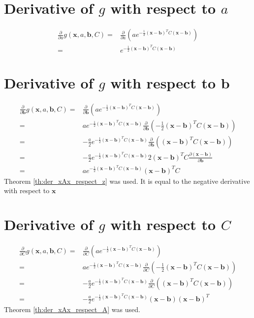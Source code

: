 \documentclass{paper}
\newcommand{\vr}[1]{\ensuremath{\boldsymbol{#1}}}
\newcommand{\mx}[1]{\ensuremath{#1}}
\begin{document}
\section{Derivative of $g$ with respect to $a$}
\begin{align}
\frac{\partial}{\partial a} g(\vr{x}, a, \vr{b}, C) =& \frac{\partial}{\partial a} \left(a e^{-\frac{1}{2}(\vr{x}-\vr{b})^T C(\vr{x}-\vr{b})} \right) \nonumber \\
=& e^{-\frac{1}{2}(\vr{x}-\vr{b})^TC(\vr{x}-\vr{b})}
\end{align}

\section{Derivative of $g$ with respect to $\vr{b}$}
\begin{align}
\frac{\partial}{\partial \vr{b}} g(\vr{x}, a, \vr{b}, C) =& \frac{\partial}{\partial \vr{b}} \left(a e^{-\frac{1}{2}(\vr{x}-\vr{b})^T C(\vr{x}-\vr{b})} \right) \nonumber \\
=& a e^{-\frac{1}{2}(\vr{x}-\vr{b})^TC(\vr{x}-\vr{b})} \frac{\partial}{\partial \vr{b}} \left(-\frac{1}{2}(\vr{x}-\vr{b})^T C(\vr{x}-\vr{b})\right) \nonumber \\
=& -\frac{a}{2} e^{-\frac{1}{2}(\vr{x}-\vr{b})^TC(\vr{x}-\vr{b})} \frac{\partial}{\partial \vr{b}} \left((\vr{x}-\vr{b})^T C(\vr{x}-\vr{b})\right) \nonumber \\
=& -\frac{a}{2} e^{-\frac{1}{2}(\vr{x}-\vr{b})^TC(\vr{x}-\vr{b})} 2 (\vr{x}-\vr{b})^T C \frac{\partial (\vr{x}-\vr{b})}{\partial \vr{b}} \nonumber \\
=& a e^{-\frac{1}{2}(\vr{x}-\vr{b})^TC(\vr{x}-\vr{b})} (\vr{x}-\vr{b})^T C
\end{align}
Theorem \ref{th:der_xAx_respect_z} was used.
It is equal to the negative derivative with respect to $\vr{x}$


\section{Derivative of $g$ with respect to $\mx{C}$}
\begin{align}
\frac{\partial}{\partial \mx{C}} g(\vr{x}, a, \vr{b}, C) =& \frac{\partial}{\partial \mx{C}} \left(a e^{-\frac{1}{2}(\vr{x}-\vr{b})^T C(\vr{x}-\vr{b})} \right) \nonumber \\
=& a e^{-\frac{1}{2}(\vr{x}-\vr{b})^TC(\vr{x}-\vr{b})} \frac{\partial}{\partial \mx{C}} \left(-\frac{1}{2}(\vr{x}-\vr{b})^T C(\vr{x}-\vr{b})\right) \nonumber \\
=& -\frac{a}{2} e^{-\frac{1}{2}(\vr{x}-\vr{b})^TC(\vr{x}-\vr{b})} \frac{\partial}{\partial \mx{C}} \left((\vr{x}-\vr{b})^T C(\vr{x}-\vr{b})\right) \nonumber \\
=& -\frac{a}{2} e^{-\frac{1}{2}(\vr{x}-\vr{b})^TC(\vr{x}-\vr{b})} (\vr{x}-\vr{b}) (\vr{x}-\vr{b})^T
\end{align}
Theorem \ref{th:der_xAx_respect_A} was used.
\end{document}
